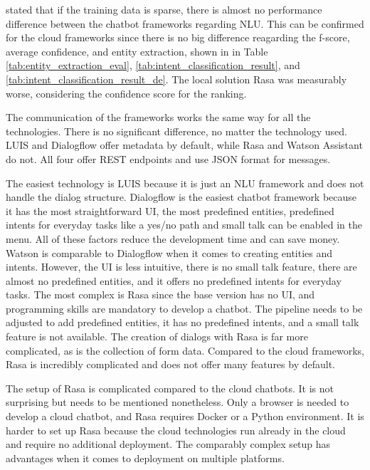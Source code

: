 \citet{braunEvaluatingNLU} stated that if the training data is sparse, there is almost no performance difference between the chatbot frameworks regarding NLU.
This can be confirmed for the cloud frameworks since there is no big difference reagarding the f-score, average confidence, and entity extraction, shown in in Table \ref{tab:entity_extraction_eval}, \ref{tab:intent_classification_result},  and \ref{tab:intent_classification_result_de}.
The local solution Rasa was measurably worse, considering the confidence score for the ranking.

The communication of the frameworks works the same way for all the technologies.
There is no significant difference, no matter the technology used.
LUIS and Dialogflow offer metadata by default, while Rasa and Watson Assistant do not.
All four offer REST endpoints and use JSON format for messages.

The easiest technology is LUIS because it is just an NLU framework and does not handle the dialog structure.
Dialogflow is the easiest chatbot framework because it has the most straightforward UI, the most predefined entities, predefined intents for everyday tasks like a yes/no path and small talk can be enabled in the menu.
All of these factors reduce the development time and can save money.
Watson is comparable to Dialogflow when it comes to creating entities and intents. However, the UI is less intuitive, there is no small talk feature, there are almost no predefined entities, and it offers no predefined intents for everyday tasks.
The most complex is Rasa since the base version has no UI, and programming skills are mandatory to develop a chatbot.
The pipeline needs to be adjusted to add predefined entities, it has no predefined intents, and a small talk feature is not available.
The creation of dialogs with Rasa is far more complicated, as is the collection of form data.
Compared to the cloud frameworks, Rasa is incredibly complicated and does not offer many features by default.

The setup of Rasa is complicated compared to the cloud chatbots.
It is not surprising but needs to be mentioned nonetheless.
Only a browser is needed to develop a cloud chatbot, and Rasa requires Docker or a Python environment.
It is harder to set up Rasa because the cloud technologies run already in the cloud and require no additional deployment.
The comparably complex setup has advantages when it comes to deployment on multiple platforms.

